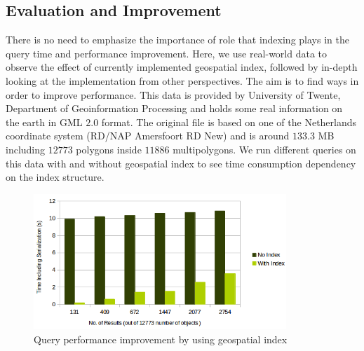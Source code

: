 \documentclass[a4paper,12pt]{article}
\begin{document}
\subsection{Evaluation and Improvement}
\label{BXevaluation}
There is no need to emphasize the importance of role that indexing plays in the query time and performance improvement. Here, we use real-world data to observe the effect of currently implemented geospatial index, followed by in-depth looking at the implementation from other perspectives. The aim is to find ways in order to improve performance. This data is provided by University of Twente, Department of Geoinformation Processing and holds some real information on the earth in GML $2.0$ format. The original file is based on one of the Netherlands coordinate system (RD/NAP Amersfoort RD New) and is around $133.3$ MB including $12773$ polygons inside $11886$ multipolygons.
We run different queries on this data with and without geospatial index to see time consumption dependency on the index structure. 
\begin{figure}
\centering
\includegraphics[width=0.85\textwidth]{IndexEfficiency-2}
\caption{Query performance improvement by using geospatial index}
\label{figIndexEfficiency}
\end{figure}
\end{document}
